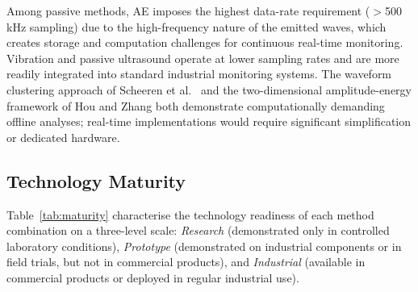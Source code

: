 Among passive methods, AE imposes the highest data-rate requirement ($>$500\,kHz sampling) due to the high-frequency nature of the emitted waves, which creates storage and computation challenges for continuous real-time monitoring. Vibration and passive ultrasound operate at lower sampling rates and are more readily integrated into standard industrial monitoring systems. The waveform clustering approach of Scheeren et al.\ \cite{scheeren_acoustic_2024} and the two-dimensional amplitude-energy framework of Hou and Zhang \cite{hou_-situ_2025} both demonstrate computationally demanding offline analyses; real-time implementations would require significant simplification or dedicated hardware.

\subsection{Technology Maturity}
\label{subsec:comp_maturity}

Table~\ref{tab:maturity} characterise the technology readiness of each method combination on a three-level scale: \textit{Research} (demonstrated only in controlled laboratory conditions), \textit{Prototype} (demonstrated on industrial components or in field trials, but not in commercial products), and \textit{Industrial} (available in commercial products or deployed in regular industrial use).

